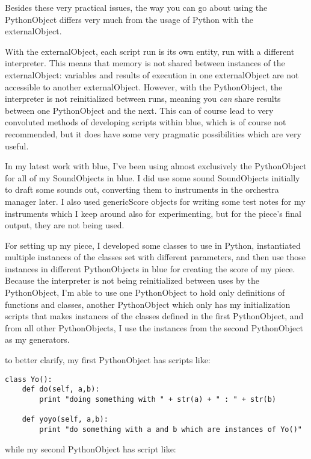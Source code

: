 Besides these very practical issues, the way you can go about using the
PythonObject differs very much from the usage of Python with the
externalObject.

With the externalObject, each script run is its own entity, run with a
different interpreter. This means that memory is not shared between
instances of the externalObject: variables and results of execution in
one externalObject are not accessible to another externalObject.
However, with the PythonObject, the interpreter is not reinitialized
between runs, meaning you \emph{can} share results between one
PythonObject and the next. This can of course lead to very convoluted
methods of developing scripts within blue, which is of course not
recommended, but it does have some very pragmatic possibilities which
are very useful.

In my latest work with blue, I've been using almost exclusively the
PythonObject for all of my SoundObjects in blue. I did use some sound
SoundObjects initially to draft some sounds out, converting them to
instruments in the orchestra manager later. I also used genericScore
objects for writing some test notes for my instruments which I keep
around also for experimenting, but for the piece's final output, they
are not being used.

For setting up my piece, I developed some classes to use in Python,
instantiated multiple instances of the classes set with different
parameters, and then use those instances in different PythonObjects in
blue for creating the score of my piece. Because the interpreter is not
being reinitialized between uses by the PythonObject, I'm able to use
one PythonObject to hold only definitions of functions and classes,
another PythonObject which only has my initialization scripts that makes
instances of the classes defined in the first PythonObject, and from all
other PythonObjects, I use the instances from the second PythonObject as
my generators.

to better clarify, my first PythonObject has scripts like:

\begin{verbatim}
class Yo(): 
    def do(self, a,b):
        print "doing something with " + str(a) + " : " + str(b)

    def yoyo(self, a,b):
        print "do something with a and b which are instances of Yo()"
\end{verbatim}

while my second PythonObject has script like:

